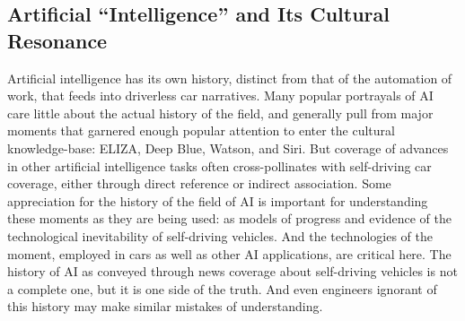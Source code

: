 \subsection{Artificial ``Intelligence'' and Its Cultural Resonance}
Artificial intelligence has its own history, distinct from that of the
automation of work, that feeds into driverless car narratives. Many popular
portrayals of AI care little about the actual history of the field,
and generally pull from major moments that garnered enough popular
attention to enter the cultural knowledge-base: ELIZA, Deep Blue,
Watson, and Siri. But coverage of advances in other artificial
intelligence tasks often cross-pollinates with self-driving car
coverage, either through direct reference or indirect association.
Some appreciation for the history of the field
of AI is important for understanding these moments as they are being
used:  as models of progress and evidence of the technological inevitability of
self-driving vehicles. And the technologies of the moment, employed in
cars as well as other AI applications, are critical here. The history
of AI as conveyed through news coverage about self-driving vehicles is
not a complete one, but it is one side of the truth. And even
engineers ignorant of this history may make similar mistakes of understanding.

